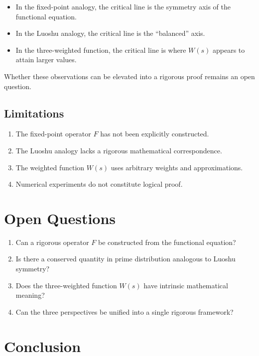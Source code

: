 \documentclass[11pt,a4paper]{article}
\theoremstyle{definition}
\begin{document}
\begin{itemize}
    \item In the fixed-point analogy, the critical line is the symmetry axis of the functional equation.
    \item In the Luoshu analogy, the critical line is the ``balanced'' axis.
    \item In the three-weighted function, the critical line is where $W(s)$ appears to attain larger values.
\end{itemize}

Whether these observations can be elevated into a rigorous proof remains an open question.

\subsection{Limitations}

\begin{enumerate}
    \item The fixed-point operator $F$ has not been explicitly constructed.
    \item The Luoshu analogy lacks a rigorous mathematical correspondence.
    \item The weighted function $W(s)$ uses arbitrary weights and approximations.
    \item Numerical experiments do not constitute logical proof.
\end{enumerate}

\section{Open Questions}

\begin{enumerate}
    \item Can a rigorous operator $F$ be constructed from the functional equation?
    \item Is there a conserved quantity in prime distribution analogous to Luoshu symmetry?
    \item Does the three-weighted function $W(s)$ have intrinsic mathematical meaning?
    \item Can the three perspectives be unified into a single rigorous framework?
\end{enumerate}

\section{Conclusion}
\end{document}
